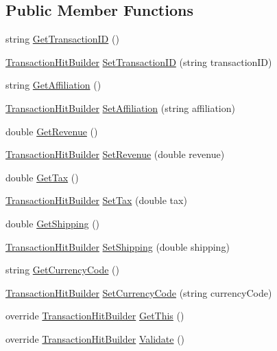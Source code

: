 \subsection*{Public Member Functions}
\begin{DoxyCompactItemize}
\item 
string \hyperlink{class_transaction_hit_builder_acdfede9b014a87d7354dc50a2e0f65c2}{Get\+Transaction\+ID} ()
\item 
\hyperlink{class_transaction_hit_builder}{Transaction\+Hit\+Builder} \hyperlink{class_transaction_hit_builder_a7e08a8d0c67790c190c1f8ce847d37b6}{Set\+Transaction\+ID} (string transaction\+ID)
\item 
string \hyperlink{class_transaction_hit_builder_ae7a3dc410650147e6dedcb37a6069983}{Get\+Affiliation} ()
\item 
\hyperlink{class_transaction_hit_builder}{Transaction\+Hit\+Builder} \hyperlink{class_transaction_hit_builder_aa63e5ecfacb04399d36c1a91786865f1}{Set\+Affiliation} (string affiliation)
\item 
double \hyperlink{class_transaction_hit_builder_ae507d460cdc0c3c7f8cdfb3349e382b1}{Get\+Revenue} ()
\item 
\hyperlink{class_transaction_hit_builder}{Transaction\+Hit\+Builder} \hyperlink{class_transaction_hit_builder_a9873c16e4a3a6554c8623ac3b33251a1}{Set\+Revenue} (double revenue)
\item 
double \hyperlink{class_transaction_hit_builder_a6b1d6a19929952515ac3800b6a13a811}{Get\+Tax} ()
\item 
\hyperlink{class_transaction_hit_builder}{Transaction\+Hit\+Builder} \hyperlink{class_transaction_hit_builder_a6de840fc1bc67c7a48849114cf7c62cb}{Set\+Tax} (double tax)
\item 
double \hyperlink{class_transaction_hit_builder_a003c7c159802d9075e7adec0e5c7aa59}{Get\+Shipping} ()
\item 
\hyperlink{class_transaction_hit_builder}{Transaction\+Hit\+Builder} \hyperlink{class_transaction_hit_builder_a219cc3ad2eb7ad3e0e45ebcb4bc55e7f}{Set\+Shipping} (double shipping)
\item 
string \hyperlink{class_transaction_hit_builder_a0a49d10145f490fcdb1b93baa7e12f43}{Get\+Currency\+Code} ()
\item 
\hyperlink{class_transaction_hit_builder}{Transaction\+Hit\+Builder} \hyperlink{class_transaction_hit_builder_a8b66c838d425e3a3c659ee7f9abd0eb8}{Set\+Currency\+Code} (string currency\+Code)
\item 
override \hyperlink{class_transaction_hit_builder}{Transaction\+Hit\+Builder} \hyperlink{class_transaction_hit_builder_a6d3d242ed5f10c7801a8e2ce8aac8ba9}{Get\+This} ()
\item 
override \hyperlink{class_transaction_hit_builder}{Transaction\+Hit\+Builder} \hyperlink{class_transaction_hit_builder_a6bde66350f8ccd032418d150f9bae1f9}{Validate} ()
\end{DoxyCompactItemize}


